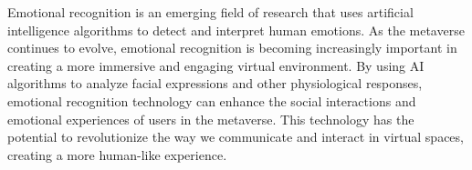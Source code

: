 Emotional recognition is an emerging field of research that uses artificial intelligence algorithms to detect and interpret human emotions. As the metaverse
continues to evolve, emotional recognition is becoming increasingly important in creating a more immersive and engaging virtual environment. By using
AI algorithms to analyze facial expressions and other physiological responses, emotional recognition technology can enhance the social interactions and
emotional experiences of users in the metaverse. This technology has the potential to revolutionize the way we communicate and interact in virtual
spaces, creating a more human-like experience.
